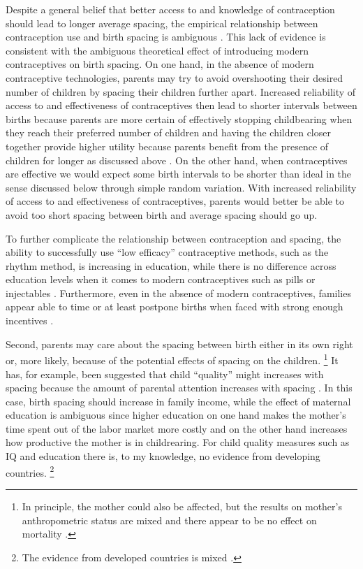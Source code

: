 Despite a general belief that better access to and knowledge of contraception should lead
to longer average spacing, the empirical relationship between contraception use and birth 
spacing is ambiguous \citep{Tulasidhar1993,Whitworth2002,Bhalotra2008,Yeakey2009,Kim2010,Soest2018}.
This lack of evidence is consistent with the ambiguous theoretical effect of introducing 
modern contraceptives on birth spacing.
On one hand, in the absence of modern contraceptive technologies, parents may try to 
avoid overshooting their desired number of children by spacing their children further apart.
Increased reliability of access to and effectiveness of contraceptives then lead to 
shorter intervals between births because parents are more certain of effectively
stopping childbearing when they reach their preferred number of children and having
the children closer together provide higher utility because parents benefit from the
presence of children for longer as discussed above \citep{Keyfitz1971,Heckman1976}.
On the other hand, when contraceptives are effective we would expect some birth 
intervals to be shorter than ideal in the sense discussed below through simple random
variation.
With increased reliability of access to and effectiveness of contraceptives, parents 
would better be able to avoid too short spacing between birth and average spacing
should go up.

To further complicate the relationship between contraception and spacing, the ability to 
successfully use ``low efficacy'' contraceptive methods, such as the rhythm method, is 
increasing in education, while there is no difference across education levels 
when it comes to modern contraceptives such as pills or injectables \citep{Rosenzweig1989}.
Furthermore, even in the absence of modern contraceptives, families appear able to time or 
at least postpone births when faced with strong enough incentives 
\citep{Jayachandran2011,Alam2018}.


Second, parents may care about the spacing between birth either in its own right or, 
more likely, because of the potential effects of spacing on the children.%
\footnote{
In principle, the mother could also be affected, but the results on mother's 
anthropometric status are mixed and there appear to be no effect on mortality 
\citep{Ronsmans1998,Menken2003,Dewey2007,Conde-Agudelo2012}.
}
It has, for example, been suggested that child ``quality'' might increases with spacing 
because the amount of parental attention increases with spacing
\citep{Zajonc1975,Zajonc1976,Razin1980}.
In this case, birth spacing should increase in family income, while the effect of maternal 
education is ambiguous since higher education on one hand makes the mother's time spent 
out of the labor market more costly and on the other hand increases how productive the 
mother is in childrearing. 
For child quality measures such as IQ and education there is, to my knowledge, no evidence 
from developing countries.%
\footnote{
The evidence from developed countries is mixed
\citep{Powell1993,Pettersson-Lidbom2009,Buckles2012,Barclay2017}.
} 


